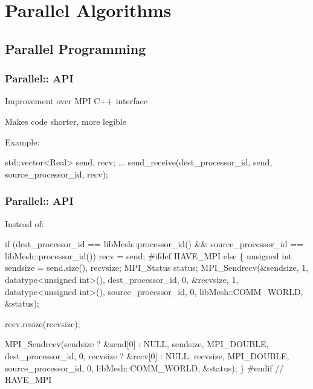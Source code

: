 \section{Parallel Algorithms}
\subsection{Parallel Programming}
\begin{frame}[fragile]
\frametitle{Parallel:: API}
\item Improvement over MPI C++ interface
\item Makes code shorter, more legible
\royitemizeend

Example:
\small
\begin{semiverbatim}
std::vector<Real> send, recv;
...
send\_receive(dest\_processor\_id, send,
             source\_processor\_id, recv);
\end{semiverbatim}
\end{frame}



\begin{frame}[fragile]
\frametitle{Parallel:: API}

Instead of:
\tiny
\begin{semiverbatim}
if (dest\_processor\_id   == libMesh::processor\_id() \&\&
    source\_processor\_id == libMesh::processor\_id())
  recv = send;
#ifdef HAVE\_MPI
else
  \{
    unsigned int sendsize = send.size(), recvsize;
    MPI\_Status status;
    MPI\_Sendrecv(\&sendsize, 1, datatype<unsigned int>(),
                 dest\_processor\_id, 0,
                 \&recvsize, 1, datatype<unsigned int>(),
                 source\_processor\_id, 0,
                 libMesh::COMM\_WORLD,
                 \&status);

    recv.resize(recvsize);

    MPI\_Sendrecv(sendsize ? \&send[0] : NULL, sendsize, MPI\_DOUBLE,
                 dest\_processor\_id, 0,
                 recvsize ? \&recv[0] : NULL, recvsize, MPI\_DOUBLE,
                 source\_processor\_id, 0,
                 libMesh::COMM\_WORLD,
                 \&status);
  \}
#endif // HAVE\_MPI
\end{semiverbatim}
\end{frame}



